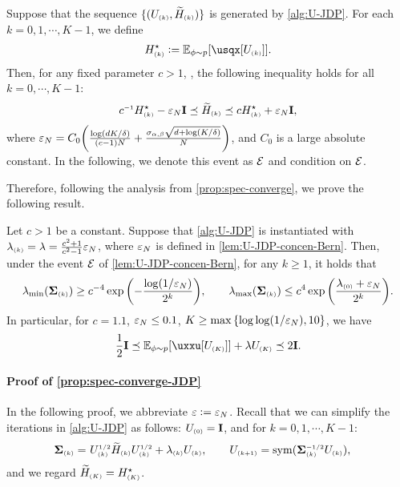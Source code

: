 \newcommand{\Hs}{H^\star}
\begin{lemma}\label{lem:U-JDP-concen-Bern}
Suppose that the sequence $\{(U_{\scriptscriptstyle{ (k) }}, \widetilde H_{\scriptscriptstyle{ (k) }})\}$ is generated by \cref{alg:U-JDP}. For each $k=0,1,\cdots,K-1$, we define
\begin{align*}
    \Hs\kk\defeq \Ep{\usqx[U\kk]}.
\end{align*}
Then, for any fixed parameter $c>1$, \whp, the following inequality holds for all $k=0,\cdots,K-1$:
\begin{align}\label{eq:U-JDP-concen-Bern}
    c\iv \Hs\kk-\epsN\id\preceq \til H\kk\preceq c\Hs\kk+\epsN\id,
\end{align}
where $\varepsilon_N=C_0{\left( \frac{\log(dK/\delta)}{(c-1)N}+\frac{\sigma_{\alpha,\beta}\sqrt{d+\log(K/\delta)}}{N} \right)}$, and $C_0$ is a large absolute constant. In the following, we denote this event as $\mathcal{E}$ and condition on $\mathcal{E}$.
\end{lemma}

Therefore, following the analysis from \cref{prop:spec-converge}, we prove the following result.

\begin{proposition}\label{prop:spec-converge-JDP}
Let $c>1$ be a constant. Suppose that \cref{alg:U-JDP} is instantiated with $\lambda_{\scriptscriptstyle{ (k) }}=\lambda=\frac{c^2+1}{c^2-1}\varepsilon_N$, where $\varepsilon_N$ is defined in \cref{lem:U-JDP-concen-Bern}. Then, under the event $\mathcal{E}$ of \cref{lem:U-JDP-concen-Bern}, for any $k\geq 1$, it holds that
\begin{align*}
    \lambda_{\min}(\boldsymbol{\Sigma}_{\scriptscriptstyle{ (k) }}) \geq c^{-4}\exp{\left(  -\frac{\log(1/\varepsilon_N)}{2^{k}}  \right)}, \qquad \lambda_{\max}(\boldsymbol{\Sigma}_{\scriptscriptstyle{ (k) }})\leq c^4 \exp{\left(  \frac{\lambda_{\scriptscriptstyle{ (0) }}+\varepsilon_N}{2^{k}}  \right)}.
\end{align*}
In particular, for $c=1.1$, $\varepsilon_N\leq 0.1$, $K\geq \max\left\{\log\log(1/\varepsilon_N),10\right\}$, we have
\begin{align*}
    \frac12\id\preceq \Ep{ \uxxu[U\kc] }+\lambda U\kc \preceq 2\id.
\end{align*}
\end{proposition}

\paragraph{Proof of \cref{prop:spec-converge-JDP}}
In the following proof, we abbreviate $\varepsilon\mathrel{\mathop:}= \varepsilon_N$.
Recall that we can simplify the iterations in \cref{alg:U-JDP} as follows: $U_{\scriptscriptstyle{ (0) }}=\mathbf{I}$, and for $k=0,1,\cdots,K-1$:
\begin{align*}
    \boldsymbol{\Sigma}_{\scriptscriptstyle{ (k) }}=&~U_{\scriptscriptstyle{ (k) }}^{{\scriptscriptstyle1/2}} \widetilde H_{\scriptscriptstyle{ (k) }} U_{\scriptscriptstyle{ (k) }}^{{\scriptscriptstyle1/2}}+\lambda_{\scriptscriptstyle{ (k) }} U_{\scriptscriptstyle{ (k) }}, \qquad
    U_{\scriptscriptstyle{ (k+1) }}=\mathrm{sym}(\boldsymbol{\Sigma}_{\scriptscriptstyle{ (k) }}^{{\scriptscriptstyle-1/2}} U_{\scriptscriptstyle{ (k) }}),
\end{align*}
and we regard $\til H\kc=\Hs\kc$.

